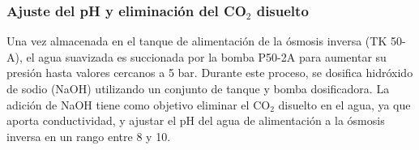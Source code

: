 \subsubsection{Ajuste del pH y eliminación del CO$_2$ disuelto }

Una vez almacenada en el tanque de alimentación de la ósmosis inversa (TK 50-A), el agua suavizada es succionada por la
bomba P50-2A para aumentar su presión hasta valores cercanos a 5 bar. Durante este proceso, se dosifica hidróxido de sodio
(NaOH) utilizando un conjunto de tanque y bomba dosificadora. La adición de NaOH tiene como objetivo eliminar el CO$_2$ disuelto en
el agua, ya que aporta conductividad, y ajustar el pH del agua de alimentación a la ósmosis inversa en un rango entre 8 y 10.\\